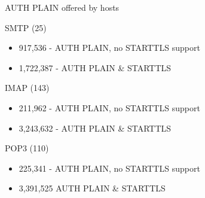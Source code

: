 \begin{frame}{AUTH PLAIN offered by hosts}

\begin{block}{SMTP (25)}

\begin{itemize}
\itemsep1pt\parskip0pt
\item
  917,536 - AUTH PLAIN, no STARTTLS support
\item
  1,722,387 - AUTH PLAIN \& STARTTLS
\end{itemize}

\end{block}

\begin{block}{IMAP (143)}

\begin{itemize}
\itemsep1pt\parskip0pt
\item
  211,962 - AUTH PLAIN, no STARTTLS support
\item
  3,243,632 - AUTH PLAIN \& STARTTLS
\end{itemize}

\end{block}

\begin{block}{POP3 (110)}

\begin{itemize}
\itemsep1pt\parskip0pt
\item
  225,341 - AUTH PLAIN, no STARTTLS support
\item
  3,391,525 AUTH PLAIN \& STARTTLS
\end{itemize}

\end{block}

\end{frame}

